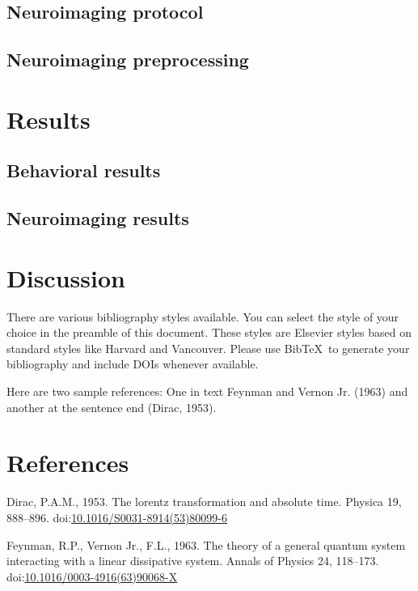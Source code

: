 \documentclass[]{elsarticle} %
\begin{document}
\hypertarget{neuroimaging-protocol}{%
\subsection{Neuroimaging protocol}\label{neuroimaging-protocol}}

\hypertarget{neuroimaging-preprocessing}{%
\subsection{Neuroimaging
preprocessing}\label{neuroimaging-preprocessing}}

\hypertarget{results}{%
\section{Results}\label{results}}

\hypertarget{behavioral-results}{%
\subsection{Behavioral results}\label{behavioral-results}}

\hypertarget{neuroimaging-results}{%
\subsection{Neuroimaging results}\label{neuroimaging-results}}

\hypertarget{discussion}{%
\section{Discussion}\label{discussion}}

There are various bibliography styles available. You can select the
style of your choice in the preamble of this document. These styles are
Elsevier styles based on standard styles like Harvard and Vancouver.
Please use BibTeX~to generate your bibliography and include DOIs
whenever available.

Here are two sample references: One in text Feynman and Vernon Jr.
(1963) and another at the sentence end (Dirac, 1953).

\hypertarget{references}{%
\section*{References}\label{references}}

\hypertarget{refs}{}
\leavevmode\hypertarget{ref-Dirac1953888}{}%
Dirac, P.A.M., 1953. The lorentz transformation and absolute time.
Physica 19, 888--896.
doi:\href{https://doi.org/10.1016/S0031-8914(53)80099-6}{10.1016/S0031-8914(53)80099-6}

\leavevmode\hypertarget{ref-Feynman1963118}{}%
Feynman, R.P., Vernon Jr., F.L., 1963. The theory of a general quantum
system interacting with a linear dissipative system. Annals of Physics
24, 118--173.
doi:\href{https://doi.org/10.1016/0003-4916(63)90068-X}{10.1016/0003-4916(63)90068-X}
\end{document}
